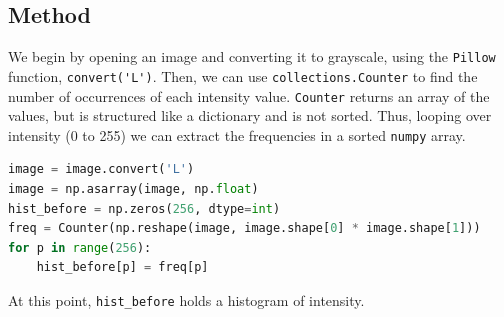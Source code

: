 \documentclass[11pt,a4paper]{article}
\begin{document}
\subsection{Method} 
We begin by opening an image and converting it to grayscale, using the \verb|Pillow| function, \verb|convert('L')|. Then, we can use \verb|collections.Counter| to find the number of occurrences of each intensity value. \verb|Counter| returns an array of the values, but is structured like a dictionary and is not sorted. Thus, looping over intensity (0 to 255) we can extract the frequencies in a sorted \verb|numpy| array.

\begin{lstlisting}[language=Python]
image = image.convert('L')
image = np.asarray(image, np.float)
hist_before = np.zeros(256, dtype=int)
freq = Counter(np.reshape(image, image.shape[0] * image.shape[1]))
for p in range(256):
    hist_before[p] = freq[p]
\end{lstlisting}

At this point, \verb|hist_before| holds a histogram of intensity.
\end{document}

